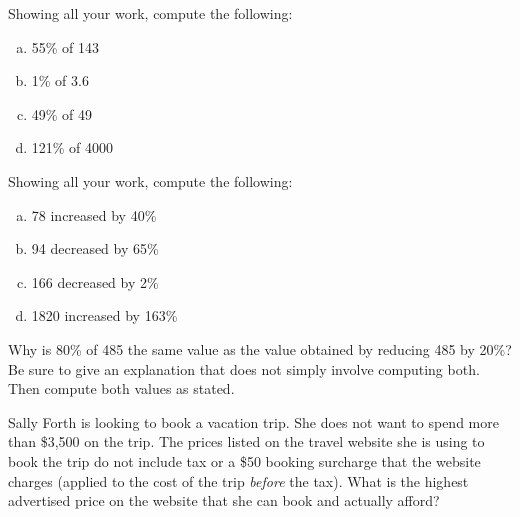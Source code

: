 \documentclass[11pt,letterpaper]{article}
\begin{document}

 Showing all your work, compute the following:
	\begin{enumerate}[(a)]
	\item 55\% of 143
	\item 1\% of 3.6
	\item 49\% of 49
	\item 121\% of 4000
	\end{enumerate}



\newpage



 Showing all your work, compute the following:
	\begin{enumerate}[(a)]
	\item 78 increased by 40\%
	\item 94 decreased by 65\%
	\item 166 decreased by 2\%
	\item 1820 increased by 163\%
	\end{enumerate}



\newpage



 Why is 80\% of 485 the same value as the value obtained by reducing 485 by 20\%? Be sure to give an explanation that does not simply involve computing both. Then compute both values as stated. 



\newpage



 Sally Forth is looking to book a vacation trip. She does not want to spend more than \$3,500 on the trip. The prices listed on the travel website she is using to book the trip do not include tax or a \$50 booking surcharge that the website charges (applied to the cost of the trip \textit{before} the tax). What is the highest advertised price on the website that she can book and actually afford?



\newpage
\end{document}
